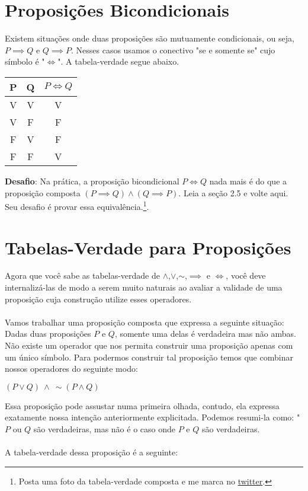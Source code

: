 \documentclass[a4paper,11pt]{book}
\theoremstyle{definition}
\theoremstyle{break}
\begin{document}
\section{Proposições Bicondicionais}

Existem situações onde duas proposições são mutuamente condicionais, ou seja, $P \implies Q$ e $Q \implies P$. Nesses casos usamos o conectivo "se e somente se" cujo símbolo é "$\iff$".  A tabela-verdade segue abaixo.

\begin{center}
\begin{tabular}{ c c || c }
 P & Q & $P \iff Q$ \\ 
 \hline
 V & V & V \\  
 V & F & F \\  
 F & V & F \\  
 F & F & V
\end{tabular}
\end{center}

\textbf{Desafio}: Na prática, a proposição bicondicional $P \iff Q$ nada mais é do que a proposição composta $(P \implies Q) \land (Q \implies P)$. Leia a seção 2.5 e volte aqui. Seu desafio é provar essa equivalência.\footnote{Posta uma foto da tabela-verdade composta e me marca no  \href{https://twitter.com/bruno_ruas2}{twitter}.}.


\section{Tabelas-Verdade para Proposições}

Agora que você sabe as tabelas-verdade de $\land$,$\lor$,$\sim$,$\implies$ e $\iff$, você deve internalizá-las de modo a serem muito naturais ao avaliar a validade de uma proposição cuja construção utilize esses operadores.
\\
\\
Vamos trabalhar uma proposição composta que expressa a seguinte situação: Dadas duas proposições $P$ e $Q$, somente uma delas é verdadeira mas não ambas. Não existe um operador que nos permita construir uma proposição apenas com um único símbolo. Para podermos construir tal proposição temos que combinar nossos operadores do seguinte modo:

\begin{center}
	$(P \lor Q) \ \land \ \sim (P \land Q)$
\end{center}

Essa proposição pode assustar numa primeira olhada, contudo, ela expressa exatamente nossa intenção anteriormente explicitada. Podemos resumi-la como: "$P$ ou $Q$ são verdadeiras, mas não é o caso onde $P$ e $Q$ são verdadeiras.
\\
\\
A tabela-verdade dessa proposição é a seguinte:
\end{document}
